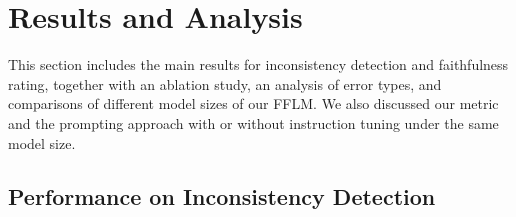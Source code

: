 \section{Results and Analysis}
\label{sec:results}

This section includes the main results for inconsistency detection and faithfulness rating, together with an ablation study, an analysis of error types, and comparisons of different model sizes of our FFLM. We also discussed our metric and the prompting approach with or without instruction tuning under the same model size.

\subsection{Performance on Inconsistency Detection}
\label{sec:results-id}


